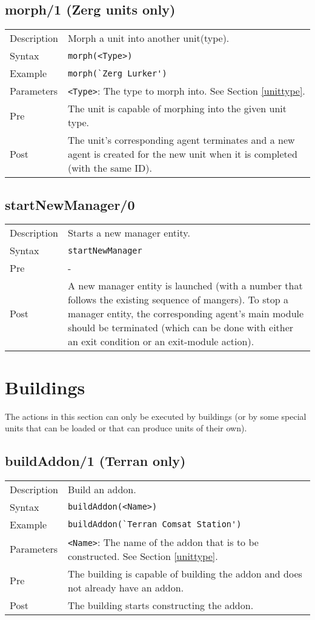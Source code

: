 \subsection{morph/1 (Zerg units only)}
\begin{tabularx}{\textwidth}{lX}
 Description & Morph a unit into another unit(type). \\
 Syntax & \verb|morph(<Type>)| \\
 Example & \verb|morph(`Zerg Lurker')| \\
 Parameters & \verb|<Type>|: The type to morph into. See Section \ref{unittype}. \\
 Pre & The unit is capable of morphing into the given unit type. \\
 Post & The unit's corresponding agent terminates and a new agent is created for the new unit when it is completed (with the same ID).
\end{tabularx}

\subsection{startNewManager/0}
\begin{tabularx}{\textwidth}{lX}
 Description & Starts a new manager entity. \\
 Syntax & \verb|startNewManager| \\
 Pre & - \\
 Post & A new manager entity is launched (with a number that follows the existing sequence of mangers). To stop a manager entity, the corresponding agent's main module should be terminated (which can be done with either an exit condition or an exit-module action).
\end{tabularx}

\pagebreak

\section{Buildings}
The actions in this section can only be executed by buildings (or by some special units that can be loaded or that can produce units of their own).

\subsection{buildAddon/1 (Terran only)}
\begin{tabularx}{\textwidth}{lX}
 Description & Build an addon. \\
 Syntax & \verb|buildAddon(<Name>)| \\
 Example & \verb|buildAddon(`Terran Comsat Station')| \\
 Parameters & \verb|<Name>|: The name of the addon that is to be constructed. See Section \ref{unittype}. \\
 Pre & The building is capable of building the addon and does not already have an addon. \\
 Post & The building starts constructing the addon.
\end{tabularx}

